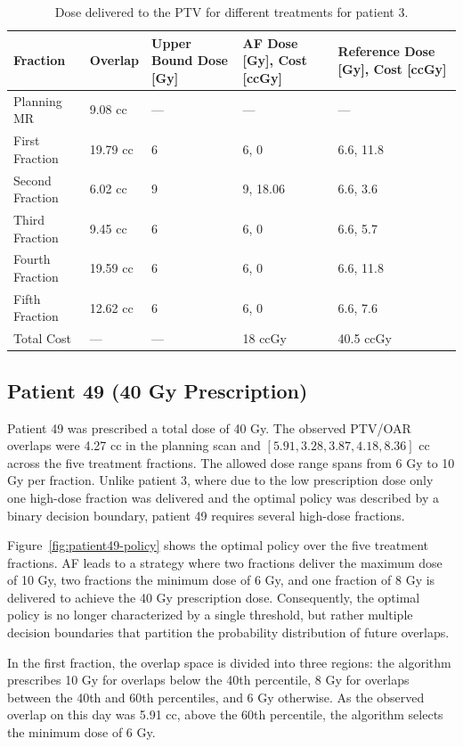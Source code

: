 \documentclass[11pt]{article}
\newcommand{\toprule}{\hline}
\newcommand{\midrule}{\hline}
\newcommand{\bottomrule}{\hline}
\begin{document}
\begin{table}[ht]
\centering
\caption{Dose delivered to the PTV for different treatments for patient 3.}
\label{tab:patient3-2025}
\begin{tabular}{lllll}
\toprule
Fraction & Overlap & Upper Bound Dose [Gy] & AF Dose [Gy], Cost [ccGy] & Reference Dose [Gy], Cost [ccGy] \\
\midrule
Planning MR & 9.08 cc & --- & --- & --- \\
First Fraction & 19.79 cc & 6 & 6, 0 & 6.6, 11.8 \\
Second Fraction & 6.02 cc & 9 & 9, 18.06 & 6.6, 3.6 \\
Third Fraction & 9.45 cc & 6 & 6, 0 & 6.6, 5.7 \\
Fourth Fraction & 19.59 cc & 6 & 6, 0 & 6.6, 11.8 \\
Fifth Fraction & 12.62 cc & 6 & 6, 0 & 6.6, 7.6 \\
Total Cost & --- & --- & 18 ccGy & 40.5 ccGy \\
\bottomrule
\end{tabular}
\end{table}

\subsection{Patient 49 (40 Gy Prescription)}

Patient 49 was prescribed a total dose of 40 Gy. The observed PTV/OAR overlaps were 4.27 cc in the planning scan and $[5.91, 3.28, 3.87, 4.18, 8.36]$ cc across the five treatment fractions. The allowed dose range spans from 6 Gy to 10 Gy per fraction. Unlike patient 3, where due to the low prescription dose only one high-dose fraction was delivered and the optimal policy was described by a binary decision boundary, patient 49 requires several high-dose fractions.

Figure~\ref{fig:patient49-policy} shows the optimal policy over the five treatment fractions. AF leads to a strategy where two fractions deliver the maximum dose of 10 Gy, two fractions the minimum dose of 6 Gy, and one fraction of 8 Gy is delivered to achieve the 40 Gy prescription dose. Consequently, the optimal policy is no longer characterized by a single threshold, but rather multiple decision boundaries that partition the probability distribution of future overlaps.

In the first fraction, the overlap space is divided into three regions: the algorithm prescribes 10 Gy for overlaps below the 40th percentile, 8 Gy for overlaps between the 40th and 60th percentiles, and 6 Gy otherwise. As the observed overlap on this day was 5.91 cc, above the 60th percentile, the algorithm selects the minimum dose of 6 Gy.
\end{document}
